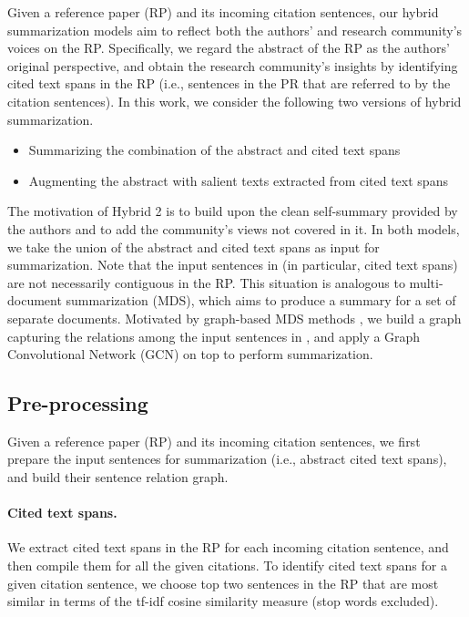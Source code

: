 \documentclass[letterpaper]{article} \usepackage{aaai19}  \usepackage{times}  \usepackage{helvet}  \usepackage{courier}  \usepackage{url}
\begin{document}
Given a reference paper (RP) and its incoming citation sentences, our hybrid summarization models aim to reflect both the authors' and research community's voices on the RP.
Specifically, we regard the abstract of the RP as the authors' original perspective, and obtain the research community's insights by identifying cited text spans in the RP (i.e., sentences in the PR that are referred to by the citation sentences).
In this work, we consider the following two versions of hybrid summarization.
\begin{itemize}[topsep=5pt]
    \setlength{\leftskip}{14.1mm}
    \setlength{\parskip}{-0.5mm}
    \item[{\bf \scalebox{1}[1]{Hybrid 1:}}] Summarizing the combination of the abstract and cited text spans
    \item[{\bf \scalebox{1}[1]{Hybrid 2:}}] Augmenting the abstract with salient texts extracted from cited text spans
\end{itemize}\vspace{-1mm}
The motivation of Hybrid 2 is to build upon the clean self-summary provided by the authors and to add the community's views not covered in it.
In both models, we take the union of the abstract and cited text spans as input  for summarization.
Note that the input sentences in  (in particular, cited text spans) are not necessarily contiguous in the RP.
This situation is analogous to
multi-document summarization (MDS),
which aims to
produce a summary for a set of separate documents.
Motivated by graph-based MDS methods \cite{erkan2004lexrank,yasunagaetal2017},
we build a graph capturing the relations among the input sentences in ,
and apply a Graph Convolutional Network (GCN) \cite{kipf2017semi} on top
to perform
summarization.



\subsection{Pre-processing}
Given a reference paper (RP) and its incoming citation sentences, we first prepare the input sentences for summarization (i.e., abstract  cited text spans), and build their sentence relation graph.

\paragraph{Cited text spans.}

We extract cited text spans in the RP for each incoming citation sentence, and then compile them for all the given citations.
To identify cited text spans for a given citation sentence, we choose top two sentences in the RP that are most similar in terms of the tf-idf cosine similarity measure (stop words excluded).
\end{document}
